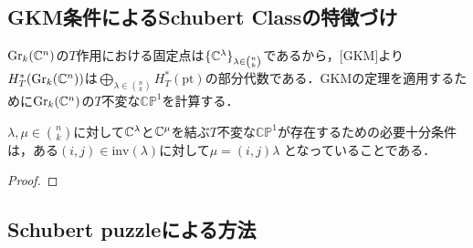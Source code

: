\subsection{GKM条件によるSchubert Classの特徴づけ}

$\text{Gr}_k(\mathbb{C}^n)$の$T$作用における固定点は$\{\mathbb{C}^\lambda\}_{\lambda\in\binom{n}{k}}$であるから，[GKM]より$H^*_T(\text{Gr}_k(\mathbb{C}^n))$は$\bigoplus_{\lambda\in\binom{n}{k}}H^*_T(\text{pt})$の部分代数である．GKMの定理を適用するために$\text{Gr}_k(\mathbb{C}^n)$の$T$不変な$\mathbb{CP}^1$を計算する．

\begin{prop}
  $\lambda,\mu\in\binom{n}{k}$に対して$\mathbb{C}^\lambda$と$\mathbb{C}^\mu$を結ぶ$T$不変な$\mathbb{CP}^1$が存在するための必要十分条件は，ある$(i, j)\in\text{inv}(\lambda)$に対して$\mu = (i, j)\lambda$
  となっていることである．
\end{prop}

\begin{proof}
  
\end{proof}







\subsection{Schubert puzzleによる方法}


